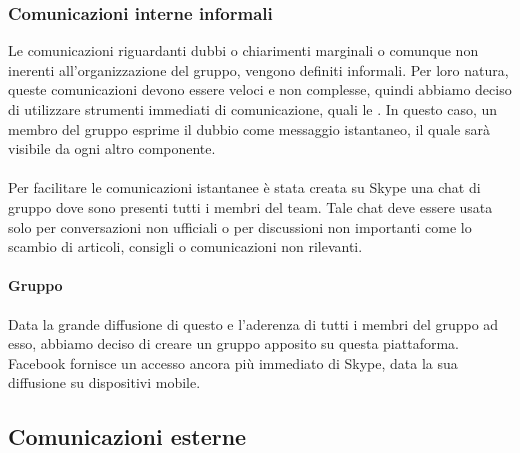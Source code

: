 \subsubsection{Comunicazioni interne informali}
Le comunicazioni riguardanti dubbi o chiarimenti marginali o comunque non inerenti all'organizzazione del gruppo, vengono definiti informali. Per loro natura, queste comunicazioni devono essere veloci e non complesse, quindi abbiamo deciso di utilizzare strumenti immediati di comunicazione, quali le . In questo caso, un membro del gruppo esprime il dubbio come messaggio istantaneo, il quale sarà visibile da ogni altro componente.

\paragraph{}
Per facilitare le comunicazioni istantanee è stata creata su Skype una chat di gruppo dove sono presenti tutti i membri del team. Tale chat deve essere usata solo per conversazioni non ufficiali o per discussioni non importanti come lo scambio di articoli, consigli o comunicazioni non rilevanti.

\paragraph{Gruppo }
Data la grande diffusione di questo  e l'aderenza di tutti i membri del gruppo ad esso, abbiamo deciso di creare un gruppo apposito su questa piattaforma. Facebook fornisce un accesso ancora più immediato di Skype, data la sua diffusione su dispositivi mobile.

\subsection{Comunicazioni esterne}
